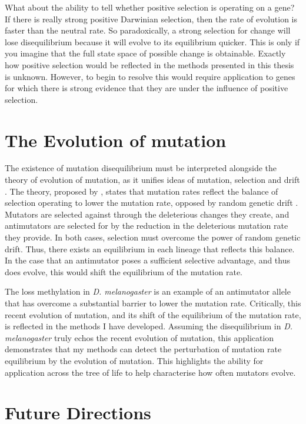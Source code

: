 What about the ability to tell whether positive selection is operating on a gene? If there is really strong positive Darwinian selection, then the rate of evolution is faster than the neutral rate. So paradoxically, a  strong selection for change will lose disequilibrium because it will evolve to its equilibrium quicker. This is only if you imagine that the full state space of possible change is obtainable. Exactly how positive selection would be reflected in the methods presented in this thesis is unknown. However, to begin to resolve this would require application to genes for which there is strong evidence that they are under the influence of positive selection. 

\section{The Evolution of mutation}

The existence of mutation disequilibrium must be interpreted alongside the theory of evolution of mutation, as it unifies ideas of mutation, selection and drift \citep{Lynch2008TheEvolution, Lynch2010EvolutionRate}. The theory, proposed by \cite{Lynch2008TheEvolution}, states that mutation rates reflect the balance of selection operating to lower the mutation rate, opposed by random genetic drift \citep{Lynch2010EvolutionRate}. Mutators are selected against through the deleterious changes they create, and antimutators are selected for by the reduction in the deleterious mutation rate they provide. In both cases, selection must overcome the power of random genetic drift. Thus, there exists an equilibrium in each lineage that reflects this balance. In the case that an antimutator poses a sufficient selective advantage, and thus does evolve, this would shift the equilibrium of the mutation rate. 

The loss methylation in \textit{D. melanogaster} is an example of an antimutator allele that has overcome a substantial barrier to lower the mutation rate. Critically, this recent evolution of mutation, and its shift of the equilibrium of the mutation rate, is reflected in the methods I have developed. Assuming the disequilibrium in \textit{D. melanogaster} truly echos the recent evolution of mutation, this application demonstrates that my methods can detect the perturbation of mutation rate equilibrium by the evolution of mutation. This highlights the ability for application across the tree of life to help characterise how often mutators evolve. 

\section{Future Directions}

